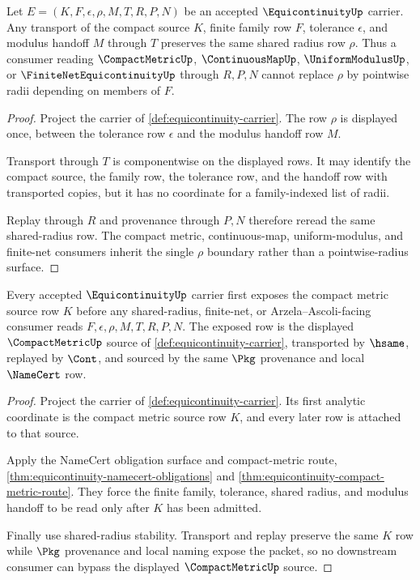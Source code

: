 \begin{theorem}
\label{thm:equicontinuity-shared-radius-stability}
Let $E=(K,F,\epsilon,\rho,M,T,R,P,N)$ be an accepted $\EquicontinuityUp$ carrier. Any transport of the compact source $K$, finite family row $F$, tolerance $\epsilon$, and modulus handoff $M$ through $T$ preserves the same shared radius row $\rho$. Thus a consumer reading $\CompactMetricUp$, $\ContinuousMapUp$, $\UniformModulusUp$, or $\FiniteNetEquicontinuityUp$ through $R,P,N$ cannot replace $\rho$ by pointwise radii depending on members of $F$.
\end{theorem}
\begin{proof}
Project the carrier of \autoref{def:equicontinuity-carrier}. The row $\rho$ is displayed once, between the tolerance row $\epsilon$ and the modulus handoff row $M$.

Transport through $T$ is componentwise on the displayed rows. It may identify the compact source, the family row, the tolerance row, and the handoff row with transported copies, but it has no coordinate for a family-indexed list of radii.

Replay through $R$ and provenance through $P,N$ therefore reread the same shared-radius row. The compact metric, continuous-map, uniform-modulus, and finite-net consumers inherit the single $\rho$ boundary rather than a pointwise-radius surface.
\end{proof}

\begin{theorem}
\label{thm:equicontinuity-root-unblock-compact-source-admission}
Every accepted $\EquicontinuityUp$ carrier first exposes the compact metric source row $K$ before any shared-radius, finite-net, or Arzela--Ascoli-facing consumer reads $F,\epsilon,\rho,M,T,R,P,N$. The exposed row is the displayed $\CompactMetricUp$ source of \autoref{def:equicontinuity-carrier}, transported by $\hsame$, replayed by $\Cont$, and sourced by the same $\Pkg$ provenance and local $\NameCert$ row.
\end{theorem}
\begin{proof}
Project the carrier of \autoref{def:equicontinuity-carrier}. Its first analytic coordinate is the compact metric source row $K$, and every later row is attached to that source.

Apply the NameCert obligation surface and compact-metric route, \autoref{thm:equicontinuity-namecert-obligations} and \autoref{thm:equicontinuity-compact-metric-route}. They force the finite family, tolerance, shared radius, and modulus handoff to be read only after $K$ has been admitted.

Finally use shared-radius stability. Transport and replay preserve the same $K$ row while $\Pkg$ provenance and local naming expose the packet, so no downstream consumer can bypass the displayed $\CompactMetricUp$ source.
\end{proof}

